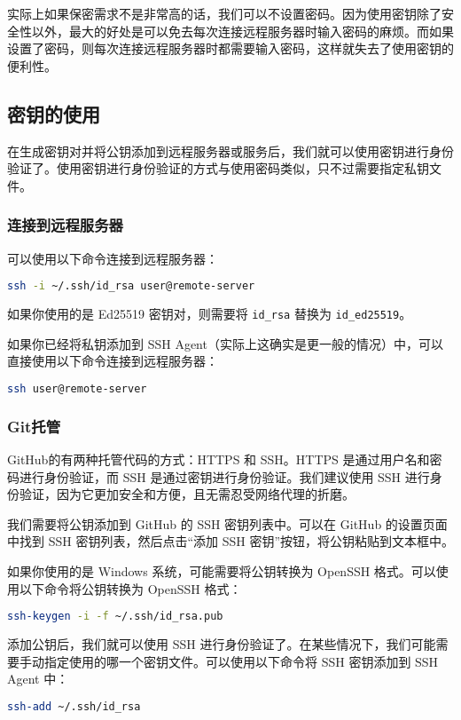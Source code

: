 \documentclass[../main.tex]{subfiles}
\begin{document}
实际上如果保密需求不是非常高的话，我们可以不设置密码。因为使用密钥除了安全性以外，最大的好处是可以免去每次连接远程服务器时输入密码的麻烦。而如果设置了密码，则每次连接远程服务器时都需要输入密码，这样就失去了使用密钥的便利性。

\subsection{密钥的使用}

在生成密钥对并将公钥添加到远程服务器或服务后，我们就可以使用密钥进行身份验证了。使用密钥进行身份验证的方式与使用密码类似，只不过需要指定私钥文件。

\subsubsection{连接到远程服务器}

可以使用以下命令连接到远程服务器：
\begin{lstlisting}[language=bash]
ssh -i ~/.ssh/id_rsa user@remote-server
\end{lstlisting}
如果你使用的是 Ed25519 密钥对，则需要将 \texttt{id\_rsa} 替换为 \texttt{id\_ed25519}。

如果你已经将私钥添加到 SSH Agent（实际上这确实是更一般的情况）中，可以直接使用以下命令连接到远程服务器：
\begin{lstlisting}[language=bash]
ssh user@remote-server
\end{lstlisting}

\subsubsection{Git托管}

GitHub的有两种托管代码的方式：HTTPS 和 SSH。HTTPS 是通过用户名和密码进行身份验证，而 SSH 是通过密钥进行身份验证。我们建议使用 SSH 进行身份验证，因为它更加安全和方便，且无需忍受网络代理的折磨。

我们需要将公钥添加到 GitHub 的 SSH 密钥列表中。可以在 GitHub 的设置页面中找到 SSH 密钥列表，然后点击“添加 SSH 密钥”按钮，将公钥粘贴到文本框中。

如果你使用的是 Windows 系统，可能需要将公钥转换为 OpenSSH 格式。可以使用以下命令将公钥转换为 OpenSSH 格式：
\begin{lstlisting}[language=bash]
ssh-keygen -i -f ~/.ssh/id_rsa.pub
\end{lstlisting}

添加公钥后，我们就可以使用 SSH 进行身份验证了。在某些情况下，我们可能需要手动指定使用的哪一个密钥文件。可以使用以下命令将 SSH 密钥添加到 SSH Agent 中：
\begin{lstlisting}[language=bash]
ssh-add ~/.ssh/id_rsa
\end{lstlisting}
\end{document}
